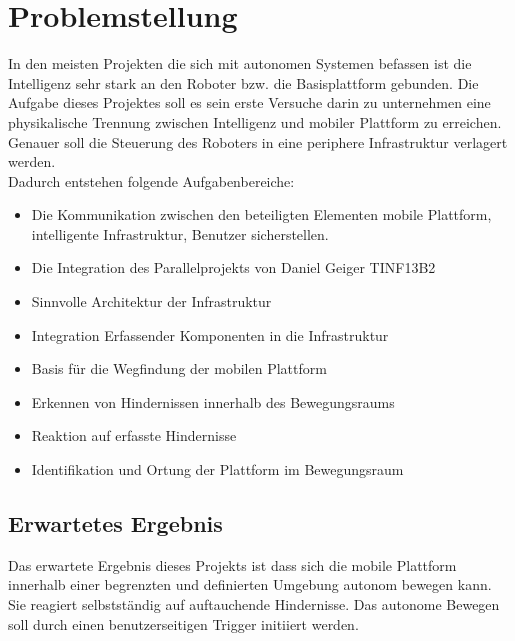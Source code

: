
\chapter{Problemstellung}
In den meisten Projekten die sich mit autonomen Systemen befassen ist die Intelligenz sehr stark an den Roboter bzw. die Basisplattform gebunden. Die Aufgabe dieses Projektes soll es sein erste Versuche darin zu unternehmen eine physikalische Trennung zwischen Intelligenz und mobiler Plattform zu erreichen. Genauer soll die Steuerung des Roboters in eine periphere Infrastruktur verlagert werden.\\
Dadurch entstehen folgende Aufgabenbereiche:
\begin{itemize}
\item Die Kommunikation zwischen den beteiligten Elementen mobile Plattform, intelligente Infrastruktur, Benutzer sicherstellen.
\item Die Integration des Parallelprojekts von Daniel Geiger TINF13B2
\item Sinnvolle Architektur der Infrastruktur
\item Integration Erfassender Komponenten in die Infrastruktur
\item Basis für die Wegfindung der mobilen Plattform
\item Erkennen von Hindernissen innerhalb des Bewegungsraums
\item Reaktion auf erfasste Hindernisse
\item Identifikation und Ortung der Plattform im Bewegungsraum
\end{itemize}
\section{Erwartetes Ergebnis}
Das erwartete Ergebnis dieses Projekts ist dass sich die mobile Plattform innerhalb einer begrenzten und definierten Umgebung autonom bewegen kann. Sie reagiert selbstständig auf auftauchende Hindernisse. Das autonome Bewegen soll durch einen benutzerseitigen Trigger initiiert werden.
